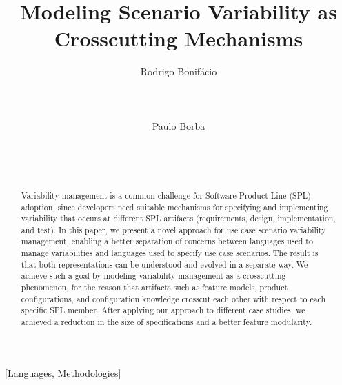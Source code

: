 \documentclass{acm_proc_article-sp}
\begin{document}
\lstset{language=Haskell, numbers=left,
numberstyle=\tiny,numbersep=5pt,basicstyle=\scriptsize,aboveskip=20pt}

\title{Modeling Scenario Variability as Crosscutting Mechanisms}



\author{
\alignauthor
Rodrigo Bonif\'{a}cio\\
       \\
       \\
       \\
\alignauthor
Paulo Borba\\
       \\
       \\
       \\
}

\maketitle

\begin{abstract}
Variability management is a common challenge for Software Product
Line (SPL) adoption, since developers need suitable
mechanisms for specifying and implementing variability
that occurs at different SPL artifacts (requirements, design,
implementation, and test). In this paper, we present a novel approach for
use case scenario variability management, enabling a better
separation of concerns between languages used to manage
variabilities and languages used to specify use case scenarios. The
result is that both representations can be understood and evolved in
a separate way. We achieve such a goal by modeling variability management
as a crosscutting phenomenon, for the reason that artifacts such as feature models,
product configurations, and configuration knowledge crosscut each
other with respect to each specific SPL member. After applying our approach to
different case studies, we achieved a reduction in the size of specifications
and a better feature modularity.
\end{abstract}

[Languages,
Methodologies]\

\end{document}
